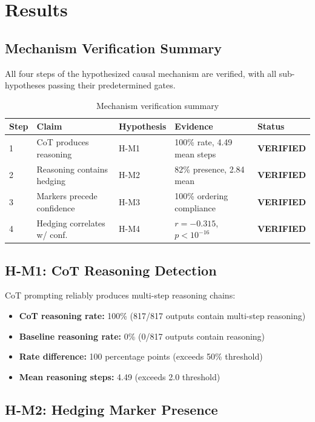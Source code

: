 \section{Results}

\subsection{Mechanism Verification Summary}

All four steps of the hypothesized causal mechanism are verified, with all sub-hypotheses passing their predetermined gates.

\begin{table}[h]
\centering
\begin{tabular}{lllll}
\toprule
Step & Claim & Hypothesis & Evidence & Status \\
\midrule
1 & CoT produces reasoning & H-M1 & 100\% rate, 4.49 mean steps & \textbf{VERIFIED} \\
2 & Reasoning contains hedging & H-M2 & 82\% presence, 2.84 mean & \textbf{VERIFIED} \\
3 & Markers precede confidence & H-M3 & 100\% ordering compliance & \textbf{VERIFIED} \\
4 & Hedging correlates w/ conf. & H-M4 & $r=-0.315$, $p<10^{-16}$ & \textbf{VERIFIED} \\
\bottomrule
\end{tabular}
\caption{Mechanism verification summary}
\label{tab:verification}
\end{table}

\subsection{H-M1: CoT Reasoning Detection}

CoT prompting reliably produces multi-step reasoning chains:

\begin{itemize}
    \item \textbf{CoT reasoning rate:} 100\% (817/817 outputs contain multi-step reasoning)
    \item \textbf{Baseline reasoning rate:} 0\% (0/817 outputs contain reasoning)
    \item \textbf{Rate difference:} 100 percentage points (exceeds 50\% threshold)
    \item \textbf{Mean reasoning steps:} 4.49 (exceeds 2.0 threshold)
\end{itemize}

\subsection{H-M2: Hedging Marker Presence}

